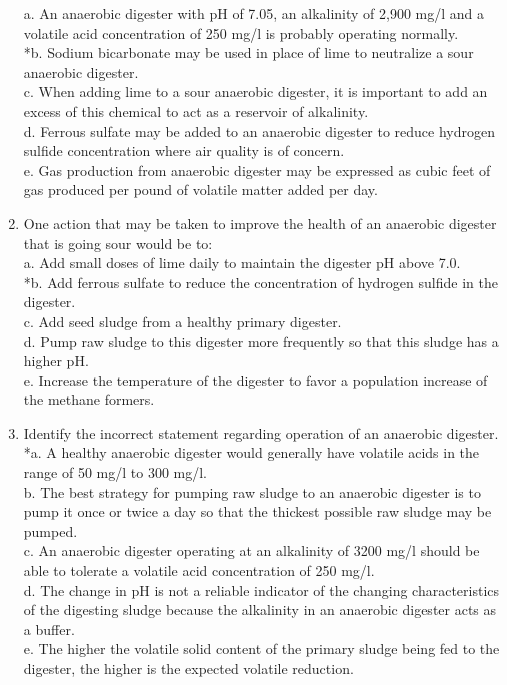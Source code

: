 \documentclass{article}
\begin{document}
\begin{enumerate}
a. An anaerobic digester with pH of 7.05, an alkalinity of 2,900 mg/l and a volatile acid concentration of 250 mg/l is probably operating normally. \\
*b. Sodium bicarbonate may be used in place of lime to neutralize a sour anaerobic digester. \\
c. When adding lime to a sour anaerobic digester, it is important to add an excess of this chemical to act as a reservoir of alkalinity. \\
d. Ferrous sulfate may be added to an anaerobic digester to reduce hydrogen sulfide concentration where air quality is of concern. \\
e. Gas production from anaerobic digester may be expressed as cubic feet of gas produced per pound of volatile matter added per day. \\

\item  One action that may be taken to improve the health of an anaerobic digester that is going sour would be to: \\

a. Add small doses of lime daily to maintain the digester pH above 7.0. \\
*b. Add ferrous sulfate to reduce the concentration of hydrogen sulfide in the digester. \\
c. Add seed sludge from a healthy primary digester. \\
d. Pump raw sludge to this digester more frequently so that this sludge has a higher pH. \\
e. Increase the temperature of the digester to favor a population increase of the methane formers. \\

\item  Identify the incorrect statement regarding operation of an anaerobic digester. \\

*a. A healthy anaerobic digester would generally have volatile acids in the range of 50 mg/l to 300 mg/l. \\
b. The best strategy for pumping raw sludge to an anaerobic digester is to pump it once or twice a day so that the thickest possible raw sludge may be pumped. \\
c. An anaerobic digester operating at an alkalinity of 3200 mg/l should be able to tolerate a volatile acid concentration of 250 mg/l. \\
d. The change in pH is not a reliable indicator of the changing characteristics of the digesting sludge because the alkalinity in an anaerobic digester acts as a buffer. \\
e. The higher the volatile solid content of the primary sludge being fed to the digester, the higher is the expected volatile reduction. \\


\end{enumerate}
\end{document}
